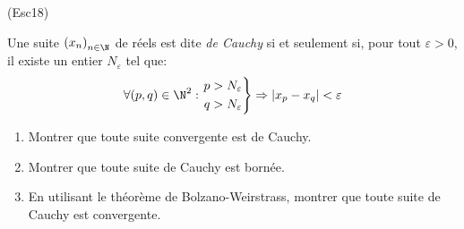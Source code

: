 \begin{tiny}(Esc18)\end{tiny} Une suite $\left( x_n\right) _{n\in \N}$ de réels est dite \emph{de Cauchy} si et seulement si, pour tout $\varepsilon> 0$, il existe un entier $N_\varepsilon$ tel que:
\begin{displaymath}
\forall(p,q)\in \N^2:
\left. 
\begin{aligned}
p>N_\varepsilon \\ q>N_\varepsilon 
\end{aligned}
 \right\rbrace \Rightarrow |x_p -x_q|<\varepsilon
\end{displaymath}
\begin{enumerate}
 \item Montrer que toute suite convergente est de Cauchy. 
 \item Montrer que toute suite de Cauchy est bornée.
 \item En utilisant le théorème de Bolzano-Weirstrass, montrer que toute suite de Cauchy est convergente.
\end{enumerate}
